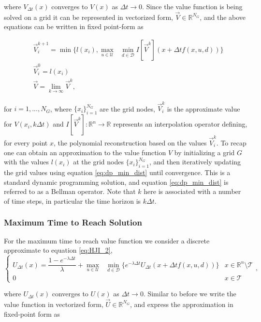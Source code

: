 \documentclass{journal}
\newcommand{\D}{\mathcal{D}}
\newcommand{\T}{\mathcal{T}}
\newcommand{\U}{\mathcal{U}}
\newcommand{\RR}{\mathbb{R}}
\newcommand{\optud}{\underset{u\in\U}{\max}\text{ }\underset{ d\in\D}{\min}}
\begin{document}
\noindent where $V_{\Delta t}(x)$ converges to $V(x)$ as $\Delta t \rightarrow 0$. Since the value function is being solved on a grid it can be represented in vectorized form, $\vec{V} \in \RR^{N_G}$, and the above equations can be written in fixed point-form as

\begin{subequations}
\begin{align}
&\vec{V}_{i}^{k+1} = \min\{l(x_i),  \underset{u\in\U}{\max}\text{ }\underset{ d\in\D}{\min} I[\vec{V}^{k}](x+\Delta t f(x,u,d))\} \label{eq:dp_min_dist}\\
&\vec{V}_{i}^{0} = l(x_i)\\
&\vec{V} = \lim_{k\rightarrow \infty} \vec{V}^{k},
\end{align}
\end{subequations}

\noindent for  $i=1, ..., N_G$, where $\{x_i\}_{i=1}^{N_G}$ are the grid nodes, $\vec{V}_i^k$ is the approximate value for $V(x_i, k \Delta t)$ and $I[\vec{V}^k]:\RR^n \rightarrow \RR$ represents an interpolation operator defining, for every point $x$, the polynomial reconstruction based on the values $\vec{V}_i^k$. To recap one can obtain an approximation to the value function $V$ by initializing a grid $G$ with the values $l(x_i)$ at the grid nodes $\{x_i\}_{i=1}^{N_G}$, and then iteratively updating the grid values using equation \ref{eq:dp_min_dist} until convergence. This is a standard dynamic programming solution, and equation \ref{eq:dp_min_dist} is referred to as a Bellman operator. Note that $k$ here is associated with a number of time steps, in particular the time horizon is $k \Delta t$.

\subsubsection{Maximum Time to Reach Solution}
For the maximum time to reach value function we consider a discrete approximate to equation \ref{eq:HJI_2},
\begin{equation}
\begin{cases}
U_{\Delta t}(x)=
\dfrac{1-e^{-\lambda \Delta t}}{\lambda}+\optud \{e^{-\lambda \Delta t} U_{\Delta t}(x+\Delta t f(x,u,d))\}  & x\in \RR^n \setminus \T \\
0 & x \in \mathcal{T}
\end{cases},
\end{equation}

\noindent where $U_{\Delta t}(x)$ converges to $U(x)$ as $\Delta t \rightarrow 0$. Similar to before we write the value function in vectorized form, $\vec{U} \in \RR^{N_G}$, and express the approximation in fixed-point form as 
\end{document}
